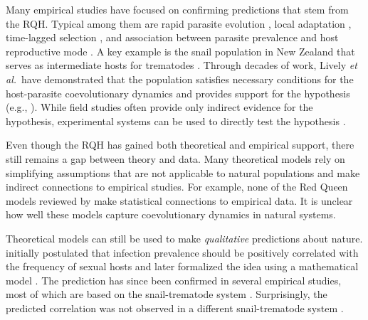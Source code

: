 \documentclass{article}\usepackage[]{graphicx}\usepackage[]{color}
\newcommand{\etal}{\textit{et al.}}
\begin{document}
Many empirical studies have focused on confirming predictions that stem from the RQH.
Typical among them are rapid parasite evolution \citep{rauch2006one}, local adaptation \citep{lively1989adaptation, morran2014experimental, king2011coevolutionary, gibson2016within}, time-lagged selection \citep{buckling2002antagonistic, decaestecker2007host, koskella2009evidence, thrall2012rapid, koskella2013phage, koskella2014bacteria}, and association between parasite prevalence and host reproductive mode \citep{lively1992parthenogenesis, vergara2013geographic, verhoeven2013geographic}. 
A key example is the snail population in New Zealand that serves as intermediate hosts for trematodes \citep{winterbourn1974larval, mcarthur1976suppression}.
Through decades of work, Lively \etal\ have demonstrated that the population satisfies necessary conditions for the host-parasite coevolutionary dynamics and provides support for the hypothesis (e.g., \cite{lively1987evidence, lively1989adaptation, dybdahl1995host, dybdahl1998host, jokela2009maintenance, vergara2014infection, gibson2016within}).
While field studies often provide only indirect evidence for the hypothesis, 
experimental systems can be used to directly test the hypothesis \citep{auld2016sex, slowinski2016coevolutionary, lynch2018turnover, zilio2018effect}.

Even though the RQH has gained both theoretical and empirical support, there still remains a gap between theory and data.
Many theoretical models rely on simplifying assumptions that are not applicable to natural populations and make indirect connections to empirical studies.
For example, none of the Red Queen models reviewed by \cite{ashby2015diversity} make statistical connections to empirical data.
It is unclear how well these models capture coevolutionary dynamics in natural systems.

Theoretical models can still be used to make \emph{qualitative} predictions about nature.
\cite{lively1992parthenogenesis} initially postulated that infection prevalence should be positively correlated with the frequency of sexual hosts and later formalized the idea using a mathematical model \citep{lively2001trematode}.
The prediction has since been confirmed in several empirical studies, most of which are based on the snail-trematode system \citep{lively2002temporal, kumpulainen2004parasites, king2011parasites, vergara2013geographic, mckone2016fine, gibson2016within}.
Surprisingly, the predicted correlation was not observed in a different snail-trematode system \citep{heller1990sexual, ben2005spatial, ben2007temporal, ben2008sex, dagan2013clonal}.
\end{document}
